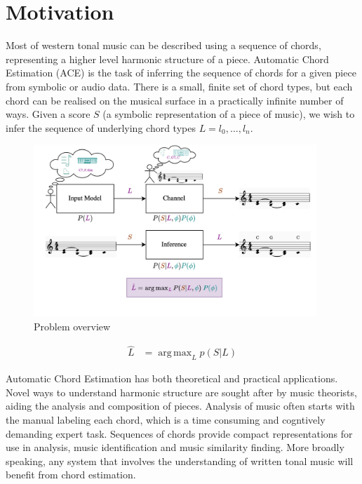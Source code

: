 \documentclass[12pt,a4paper,twoside,openright]{report}
\DeclareMathOperator*{\argmax}{arg\,max}
\theoremstyle{definition}
\begin{document}
\section{Motivation}
Most of western tonal music can be described using a sequence of chords, representing a higher level harmonic structure of a piece. Automatic Chord Estimation (ACE) is the task of inferring the sequence of chords for a given piece from symbolic or audio data. There is a small, finite set of chord types, but each chord can be realised on the musical surface in a practically infinite number of ways. Given a score $S$ (a symbolic representation of a piece of music), we wish to infer the sequence of underlying chord types $L = l_0, \dots, l_n$. 

\begin{figure}[h]
  \centering
  \includegraphics[width=0.95\textwidth]{intro/overview}
  \caption{Problem overview}
  \label{fig:overview}
\end{figure}


\begin{equation}
  \begin{align}
    \hat L &= \argmax_L p(S|L) 
  \end{align}
\end{equation} 

Automatic Chord Estimation has both theoretical and practical applications. Novel ways to understand harmonic structure are sought after by music theorists, aiding the analysis and composition of pieces. Analysis of music often starts with the manual labeling each chord, which is a time consuming and cogntively demanding expert task. Sequences of chords provide compact representations for use in analysis, music identification and music similarity finding. More broadly speaking, any system that involves the understanding of written tonal music will benefit from chord estimation. 
\end{document}
